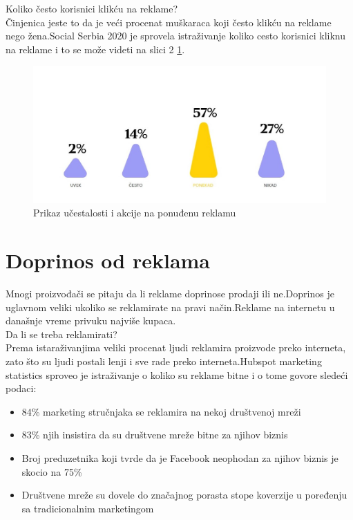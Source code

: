 \documentclass[a4paper]{article}
\begin{document}
	
	Koliko često korisnici klikću na reklame?\\
	Činjenica jeste to da je veći procenat muškaraca koji često klikću na reklame nego žena.Social Serbia 2020 \cite{socialserbia} je sprovela istraživanje koliko cesto korisnici kliknu na reklame i to se može videti na slici 2 \ref{fig:klik_na_reklamu}.\\
	
	
	\begin{figure}[h!]
		\begin{center}
			\includegraphics[scale=0.55]{klik_na_reklamu.jpg}
		\end{center}
		\caption{Prikaz učestalosti i akcije na ponuđenu reklamu}
		\label{fig:klik_na_reklamu}
	\end{figure}
	\section{Doprinos od reklama}
	\label{sec:doprinos}
	Mnogi proizvođači se pitaju da li reklame doprinose prodaji ili ne.Doprinos je uglavnom veliki ukoliko se reklamirate na pravi način.Reklame na internetu u današnje vreme privuku najviše kupaca.\\
	Da li se treba reklamirati?\\
	Prema istaraživanjima veliki procenat ljudi reklamira proizvode preko interneta, zato što su ljudi postali lenji i sve rade preko interneta.Hubspot marketing statistics \cite{marketingstatistics} sproveo je istraživanje o koliko su reklame bitne i o tome govore sledeći podaci: \\
	\begin{itemize}
		\item 84\% marketing stručnjaka se reklamira na nekoj društvenoj mreži
		\item 83\% njih insistira da su društvene mreže bitne za njihov biznis
		\item Broj preduzetnika koji tvrde da je Facebook neophodan za njihov biznis je skocio na 75\%
		\item Društvene mreže su dovele do značajnog porasta stope koverzije u poređenju sa tradicionalnim marketingom 
	\end{itemize} \\
\end{document}
